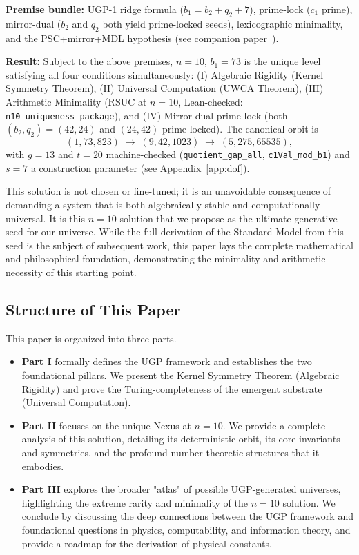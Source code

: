 \documentclass[12pt]{article}
\numberwithin{equation}{section}
\begin{document}
\begin{tcolorbox}[colback=blue!3!white,colframe=blue!40!black,title={Nexus Theorem (conditional form)},fonttitle=\bfseries]
\textbf{Premise bundle:} UGP-1 ridge formula ($b_1=b_2+q_2+7$), prime-lock ($c_1$ prime), mirror-dual ($b_2$ and $q_2$ both yield prime-locked seeds), lexicographic minimality, and the PSC+mirror+MDL hypothesis (see companion paper~\cite{SpivackUGPUniqueness}).

\smallskip
\textbf{Result:} Subject to the above premises, $n=10$, $b_1=73$ is the unique level satisfying all four conditions simultaneously: (I) Algebraic Rigidity (Kernel Symmetry Theorem), (II) Universal Computation (UWCA Theorem), (III) Arithmetic Minimality (RSUC at $n=10$, Lean-checked: \texttt{n10\_uniqueness\_package}), and (IV) Mirror-dual prime-lock (both $(b_2,q_2)=(42,24)$ and $(24,42)$ prime-locked). The canonical orbit is
\[
(1,73,823) \;\longrightarrow\; (9,42,1023) \;\longrightarrow\; (5,275,65535),
\]
with $g=13$ and $t=20$ machine-checked (\texttt{quotient\_gap\_all}, \texttt{c1Val\_mod\_b1}) and $s=7$ a construction parameter (see Appendix~\ref{app:dof}).
\end{tcolorbox}

This solution is not chosen or fine-tuned; it is an unavoidable consequence of demanding a system that is both algebraically stable and computationally universal. It is this $n=10$ solution that we propose as the ultimate generative seed for our universe. While the full derivation of the Standard Model from this seed is the subject of subsequent work, this paper lays the complete mathematical and philosophical foundation, demonstrating the minimality and arithmetic necessity of this starting point.

\subsection{Structure of This Paper}
This paper is organized into three parts. 
\begin{itemize}
    \item \textbf{Part I} formally defines the UGP framework and establishes the two foundational pillars. We present the Kernel Symmetry Theorem (Algebraic Rigidity) and prove the Turing-completeness of the emergent substrate (Universal Computation).
    \item \textbf{Part II} focuses on the unique Nexus at $n=10$. We provide a complete analysis of this solution, detailing its deterministic orbit, its core invariants and symmetries, and the profound number-theoretic structures that it embodies.
    \item \textbf{Part III} explores the broader "atlas" of possible UGP-generated universes, highlighting the extreme rarity and minimality of the $n=10$ solution. We conclude by discussing the deep connections between the UGP framework and foundational questions in physics, computability, and information theory, and provide a roadmap for the derivation of physical constants.
\end{itemize}
\end{document}
